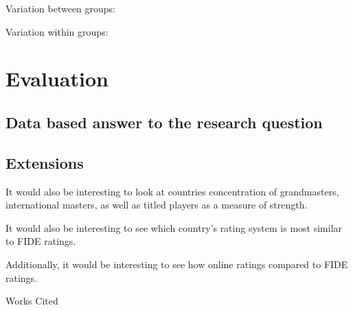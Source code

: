 \documentclass[12pt]{article}
\begin{document}
Variation between groups:

Variation within groups:


\section{Evaluation}
\subsection{Data based answer to the research question}
\subsection{Extensions}
It would also be interesting to look at countries concentration of grandmasters, international masters, as well as titled players as a measure of strength. 

It would also be interesting to see which country's rating system is most similar to FIDE ratings.

Additionally, it would be interesting to see how online ratings compared to FIDE ratings.

\newpage
\begin{center}
Works Cited
\end{center}
\end{document}
